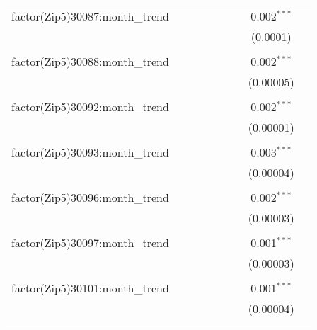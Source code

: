 \begin{table}[H]
{\begin{tabular}{@{\extracolsep{5pt}}lcccccccc}
  factor(Zip5)30087:month\_trend &  &  &  &  &  &  & 0.002$^{***}$ &  \\  

   &  &  &  &  &  &  & (0.0001) &  \\  

   & & & & & & & & \\  

  factor(Zip5)30088:month\_trend &  &  &  &  &  &  & 0.002$^{***}$ &  \\  

   &  &  &  &  &  &  & (0.00005) &  \\  

   & & & & & & & & \\  

  factor(Zip5)30092:month\_trend &  &  &  &  &  &  & 0.002$^{***}$ &  \\  

   &  &  &  &  &  &  & (0.00001) &  \\  

   & & & & & & & & \\  

  factor(Zip5)30093:month\_trend &  &  &  &  &  &  & 0.003$^{***}$ &  \\  

   &  &  &  &  &  &  & (0.00004) &  \\  

   & & & & & & & & \\  

  factor(Zip5)30096:month\_trend &  &  &  &  &  &  & 0.002$^{***}$ &  \\  

   &  &  &  &  &  &  & (0.00003) &  \\  

   & & & & & & & & \\  

  factor(Zip5)30097:month\_trend &  &  &  &  &  &  & 0.001$^{***}$ &  \\  

   &  &  &  &  &  &  & (0.00003) &  \\  

   & & & & & & & & \\  

  factor(Zip5)30101:month\_trend &  &  &  &  &  &  & 0.001$^{***}$ &  \\  

   &  &  &  &  &  &  & (0.00004) &  \\  

   & & & & & & & & \\  


\end{tabular}}
\end{table}
